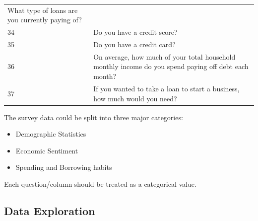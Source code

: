 \begin{longtable}[]{@{}ll@{}}
\begin{minipage}[t]{0.89\columnwidth}
What type of loans are you currently paying of?\strut
\end{minipage}\tabularnewline
\begin{minipage}[t]{0.05\columnwidth}\raggedright
34\strut
\end{minipage} & \begin{minipage}[t]{0.89\columnwidth}\raggedright
Do you have a credit score?\strut
\end{minipage}\tabularnewline
\begin{minipage}[t]{0.05\columnwidth}\raggedright
35\strut
\end{minipage} & \begin{minipage}[t]{0.89\columnwidth}\raggedright
Do you have a credit card?\strut
\end{minipage}\tabularnewline
\begin{minipage}[t]{0.05\columnwidth}\raggedright
36\strut
\end{minipage} & \begin{minipage}[t]{0.89\columnwidth}\raggedright
On average, how much of your total household monthly income do you spend
paying off debt each month?\strut
\end{minipage}\tabularnewline
\begin{minipage}[t]{0.05\columnwidth}\raggedright
37\strut
\end{minipage} & \begin{minipage}[t]{0.89\columnwidth}\raggedright
If you wanted to take a loan to start a business, how much would you
need?\strut
\end{minipage}\tabularnewline
\bottomrule
\end{longtable}

The survey data could be split into three major categories:

\begin{itemize}
\tightlist
\item
  Demographic Statistics
\item
  Economic Sentiment
\item
  Spending and Borrowing habits
\end{itemize}

Each question/column should be treated as a categorical value.

\hypertarget{data-exploration}{%
\subsection{Data Exploration}\label{data-exploration}}

